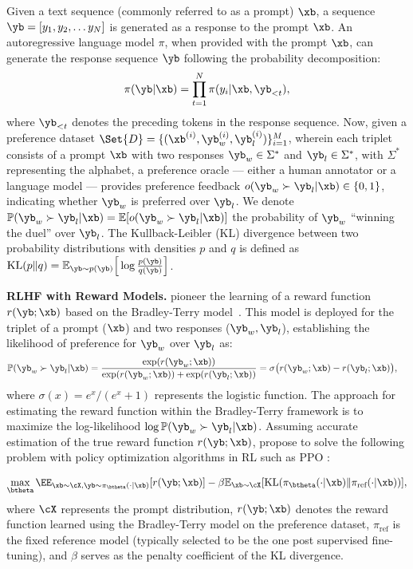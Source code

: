 \label{Preliminaries}
Given a text sequence (commonly referred to as a prompt) $\xb$, a sequence $\yb = [y_1, y_2, \dots y_N]$ is generated as a response to the prompt $\xb$.  
An autoregressive language model $\pi$, when provided with the prompt $\xb$, can generate the response sequence $\yb$ following the probability decomposition:
\begin{equation}
    \pi(\yb|\xb) = \prod_{t=1}^{N}\pi(y_i|\xb, \yb_{<t}),
\end{equation}
where $\yb_{<t}$ denotes the preceding tokens in the response sequence.
Now, given a preference dataset $\Set{D} = \{ (\xb^{(i)}, \yb_w^{(i)}, \yb_l^{(i)}) \}_{i=1}^{M}$, wherein each triplet consists of a prompt $\xb$ with two responses $\yb_w\in\Sigma^{*}$ and $\yb_l\in\Sigma^{*}$, with $\Sigma^{*}$ representing the alphabet, a preference oracle --- either a human annotator or a language model --- provides preference feedback $o(\yb_w \succ \yb_l |\xb) \in \{0,1\}$, indicating whether $\yb_w$ is preferred over $\yb_l$. We denote $\mathbb{P}(\yb_w \succ \yb_l| \xb) = \mathbb{E}[o(\yb_w \succ \yb_l|\xb)]$ the probability of $\yb_w$ ``winning the duel'' over $\yb_l$. The Kullback-Leibler (KL) divergence between two probability distributions with densities $p$ and $q$ is defined as $\mathrm{KL}(p \| q) = \mathbb{E}_{\yb \sim p(\yb)} \Big[\log \frac{p(\yb)}{q(\yb)} \Big]$.

\textbf{RLHF with Reward Models.} \citet{ChristianoLBMLA17} pioneer the learning of a reward function $r(\yb ;\xb)$ based on the Bradley-Terry model~\citep{bradley1952rank}. This model is deployed for 
the triplet of a prompt ($\xb$) and two responses ($\yb_w,\yb_l$), establishing the likelihood of preference for $\yb_w$ over $\yb_l$ as:
\begin{align}
    \mathbb{P}(\yb_w \succ \yb_l | \xb)
    & = 
    \frac{\exp(r(\yb_w; \xb))}{\exp(r(\yb_w; \xb)) + \exp(r(\yb_l; \xb))}
    =
    \sigma \big(r(\yb_w; \xb)-r(\yb_l; \xb)
    \big),
\end{align}
where $\sigma(x) = e^x / (e^x + 1)$ represents the logistic function. The approach for estimating the reward function within the Bradley-Terry framework is to maximize the log-likelihood $\log \mathbb{P}(\yb_w \succ \yb_l | \xb)$. Assuming accurate estimation of the true reward function $r(\yb; \xb)$, \citet{ChristianoLBMLA17} propose to solve the following problem with policy optimization algorithms in RL such as PPO \citep{PPO}:

\begin{align}
    \max_{\btheta} 
    \EE_{\xb \sim \cX, \yb \sim \pi_{\btheta}(\cdot|\xb)}
    [
    r(\yb; \xb)
    ]
    -
    \beta
    \mathbb{E}_{\xb \sim \cX}
    [\mathrm{KL}(\pi_{\btheta}(\cdot|\xb) \| \pi_{\text{ref}}(\cdot|\xb))],
\end{align}
where $\cX$ represents the prompt distribution,
$r(\yb; \xb)$ denotes the reward function learned using the Bradley-Terry model on the preference dataset,
$\pi_{\text{ref}}$ is the fixed reference model (typically selected to be the one post supervised fine-tuning), and $\beta$ serves as the penalty coefficient of the KL divergence.

